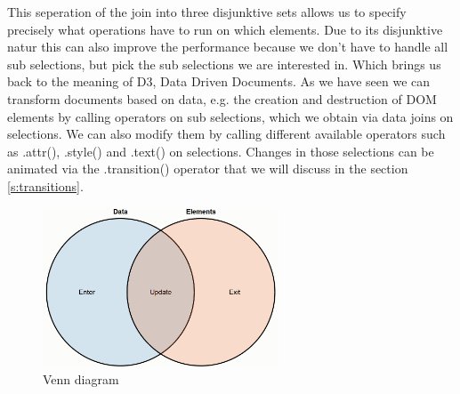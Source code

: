 \documentclass{bioinfo}
\begin{document}
This seperation of the join into three disjunktive sets allows us to specify precisely what operations have to run on which elements. Due to its disjunktive natur this can also improve the performance because we don't have to handle all sub selections, but pick the sub selections we are interested in.
Which brings us back to the meaning of D3, Data Driven Documents.
As we have seen we can transform documents based on data, e.g. the creation and destruction of DOM elements by calling operators on sub selections, which we obtain via data joins on selections.
We can also modify them by calling different available operators such as .attr(), .style() and .text() on selections.
Changes in those selections can be animated via the .transition() operator that we will discuss in the section \ref{s:transitions}.

\begin{figure}[!tpb]
\centerline{\includegraphics[width=70mm]{vennDiagram.PNG}} %
\caption{Venn diagram}\label{fig:venn}
\end{figure}
\end{document}
